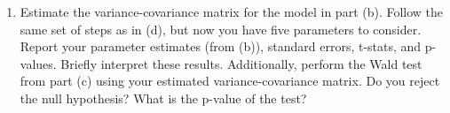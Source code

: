 \documentclass[11pt,letterpaper]{article}
\begin{document}
\begin{enumerate}[label=\alph*., leftmargin=*]
	\item Estimate the variance-covariance matrix for the model in part (b). Follow the same set of steps as in (d), but now you have five parameters to consider. Report your parameter estimates (from (b)), standard errors, t-stats, and p-values. Briefly interpret these results. Additionally, perform the Wald test from part (c) using your estimated variance-covariance matrix. Do you reject the null hypothesis? What is the p-value of the test?
\end{enumerate}
\end{document}

